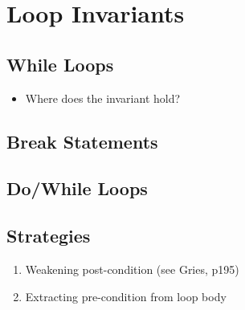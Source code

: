 \section{Loop Invariants}

\subsection{While Loops}
\begin{itemize}
\item Where does the invariant hold?
\end{itemize}
\subsection{Break Statements}
\subsection{Do/While Loops}
\subsection{Strategies}
\begin{enumerate}
\item Weakening post-condition (see Gries, p195)
\item Extracting pre-condition from loop body
\end{enumerate}